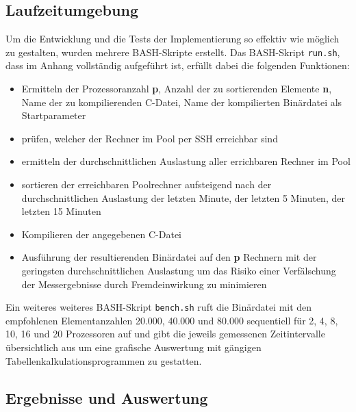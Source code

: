 \documentclass[a4paper,12pt]{scrartcl}
\begin{document}
\subsection{Laufzeitumgebung}
Um die Entwicklung und die Tests der Implementierung so effektiv wie m\"oglich zu gestalten, wurden mehrere BASH-Skripte erstellt.
Das BASH-Skript \texttt{run.sh}, dass im Anhang vollst\"andig aufgef\"uhrt ist,  erf\"ullt dabei die folgenden Funktionen:
\begin{itemize}
 \item Ermitteln der Prozessoranzahl \textbf{p}, Anzahl der zu sortierenden Elemente \textbf{n}, Name der zu kompilierenden C-Datei, Name der kompilierten
Bin\"ardatei als Startparameter
 \item pr\"ufen, welcher der Rechner im Pool per SSH erreichbar sind
 \item ermitteln der durchschnittlichen Auslastung aller errichbaren Rechner im Pool
 \item sortieren der erreichbaren Poolrechner aufsteigend nach der durchschnittlichen Auslastung der letzten Minute, der letzten 5 Minuten, der letzten 15
Minuten
 \item Kompilieren der angegebenen C-Datei
 \item Ausf\"uhrung der resultierenden Bin\"ardatei auf den \textbf{p} Rechnern mit der geringsten durchschnittlichen Auslastung um das Risiko einer
Verf\"alschung der Messergebnisse durch Fremdeinwirkung zu minimieren
\end{itemize}

Ein weiteres weiteres BASH-Skript \texttt{bench.sh} ruft die Bin\"ardatei mit den empfohlenen Elementanzahlen 20.000, 40.000 und 80.000 sequentiell f\"ur 2, 4,
8, 10, 16 und 20 Prozessoren auf und gibt die jeweils gemessenen Zeitintervalle \"ubersichtlich aus um eine grafische Auswertung mit g\"angigen
Tabellenkalkulationsprogrammen zu gestatten. 

\subsection{Ergebnisse und Auswertung}
\end{document}
